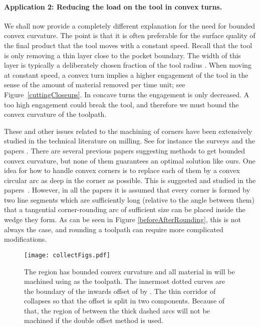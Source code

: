\documentclass{article}
\begin{document}
\paragraph{Application 2: Reducing the load on the tool in convex turns.}
We shall now provide a completely different explanation for the need
for bounded convex curvature. The point is that it is often preferable
for the surface quality of the final product that the tool moves with a constant
speed. Recall that the tool is only removing a thin layer
close to the pocket boundary. The width of this layer is typically a
deliberately chosen fraction of the tool radius .
When moving at constant speed, a convex
turn implies a higher engagement of the tool in the sense of the amount of
material removed per time unit; see Figure~\ref{cuttingCloseups}.
In concave turns the engagement is only decreased.  A too high
engagement could break the tool, and therefore we must bound the
convex curvature of the toolpath.

These and other issues related to the machining of corners have been extensively studied in the technical literature on milling.
See for instance the surveys \cite{hatna1998automatic,toh2004study} and
the papers \cite{burek2019simulation,burek2019numerical,choy2003corner,han2015precise,
iwabe1994study,pateloup2004corner,shixiong2018tool,tong2018prediction,zhao2007pocketing}.
There are several previous papers suggesting methods to get bounded
convex curvature, but none of them guarantees an optimal solution like
ours. One idea for how to handle convex corners is to replace each
of them by a convex circular arc as deep in the corner
as possible. This is suggested and studied
in the papers~\cite{choy2003corner,iwabe1994study,pateloup2004corner,shixiong2018tool}.
However, in all the papers it is assumed that every corner is formed by two
line segments which are
sufficiently long (relative to the angle between them) that a tangential
corner-rounding arc of sufficient size can be placed inside the wedge 
they form.
As can be seen in Figure \ref{beforeAfterRounding}, this is not always the case,
and rounding a toolpath can require more complicated modifications.

\begin{figure}
\centering
\texttt{[image: collectFigs.pdf]}
\caption{The region 
has bounded convex curvature and all material in  will be machined using 
as the toolpath.
The innermost dotted curves are the boundary of the inwards offset of  by .
The thin corridor of  collapses so that the offset is split in two components.
Because of that, the region of  between the thick dashed arcs will not be machined if the double offset method is used.}
\label{boneFig}
\end{figure}
\end{document}
